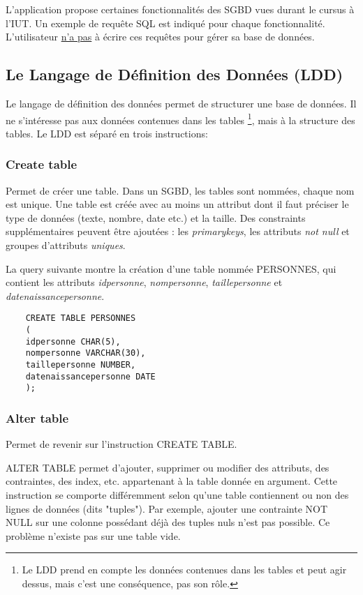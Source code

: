 L'application propose certaines fonctionnalités des SGBD vues durant le cursus à l'IUT.
Un exemple de requête SQL est indiqué pour chaque fonctionnalité.
L'utilisateur \underline{n'a pas} à écrire ces requêtes pour gérer sa base de données.

\subsection{Le Langage de Définition des Données (LDD)}
Le langage de définition des données permet de structurer une base de données.
Il ne s'intéresse pas aux données contenues dans les tables
\footnote{\label{interet_ldd}Le LDD prend en compte les données contenues dans les tables et peut agir dessus, mais c'est une conséquence, pas son rôle.}, mais à la structure des tables. Le LDD est séparé en trois instructions:

\subsubsection{Create table}
Permet de créer une \gls{table}. Dans un SGBD, les tables sont nommées, chaque nom est unique.
Une table est créée avec au moins un attribut dont il faut préciser le type de données (texte, nombre, date etc.) et la taille.
Des \glspl{constraint} supplémentaires peuvent être ajoutées : les \textit{\glspl{primarykey}}, les attributs \textit{not null} et groupes d'attributs \textit{uniques}.

La \gls{query} suivante montre la création d'une table nommée PERSONNES, qui contient les attributs \textit{idpersonne}, \textit{nompersonne}, \textit{taillepersonne} et \textit{datenaissancepersonne}.

  \begin{lstlisting}
    CREATE TABLE PERSONNES
    (
    idpersonne CHAR(5),
    nompersonne VARCHAR(30),
    taillepersonne NUMBER,
    datenaissancepersonne DATE
    );
  \end{lstlisting}

\subsubsection{Alter table}
Permet de revenir sur l'instruction CREATE TABLE.

ALTER TABLE permet d'ajouter, supprimer ou modifier des \glspl{attribut}, des contraintes, des index, etc. appartenant à la table donnée en argument.
Cette instruction se comporte différemment selon qu'une table contiennent ou non des lignes de données (dits "\glspl{tuple}").
Par exemple, ajouter une contrainte NOT NULL sur une colonne possédant déjà des tuples nuls n'est pas possible.
Ce problème n'existe pas sur une table vide.

